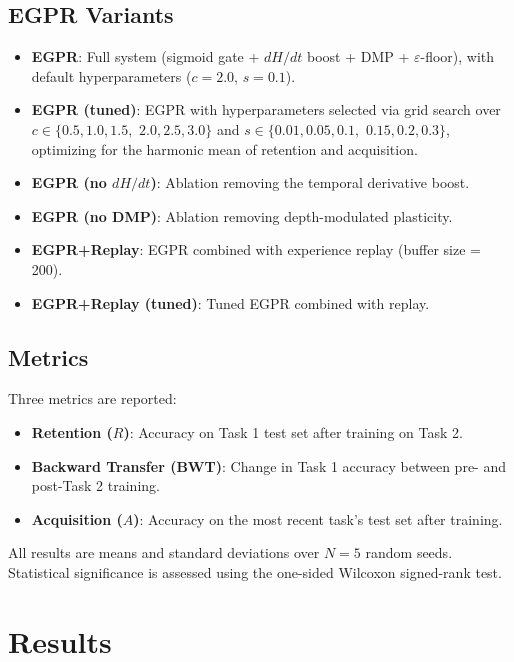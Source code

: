 \documentclass[11pt,a4paper]{article}
\begin{document}
\subsection{EGPR Variants}

\begin{itemize}
    \item \textbf{EGPR}: Full system (sigmoid gate + $dH/dt$ boost + DMP + $\varepsilon$-floor), with default hyperparameters ($c = 2.0$, $s = 0.1$).
    \item \textbf{EGPR (tuned)}: EGPR with hyperparameters selected via grid search over $c \in \{0.5, 1.0, 1.5,$ $2.0, 2.5, 3.0\}$ and $s \in \{0.01, 0.05, 0.1,$ $0.15, 0.2, 0.3\}$, optimizing for the harmonic mean of retention and acquisition.
    \item \textbf{EGPR (no $dH/dt$)}: Ablation removing the temporal derivative boost.
    \item \textbf{EGPR (no DMP)}: Ablation removing depth-modulated plasticity.
    \item \textbf{EGPR+Replay}: EGPR combined with experience replay (buffer size = 200).
    \item \textbf{EGPR+Replay (tuned)}: Tuned EGPR combined with replay.
\end{itemize}

\subsection{Metrics}

Three metrics are reported:

\begin{itemize}
    \item \textbf{Retention ($R$)}: Accuracy on Task 1 test set after training on Task 2.
    \item \textbf{Backward Transfer (BWT)}: Change in Task 1 accuracy between pre- and post-Task 2 training.
    \item \textbf{Acquisition ($A$)}: Accuracy on the most recent task's test set after training.
\end{itemize}

All results are means and standard deviations over $N = 5$ random seeds. Statistical significance is assessed using the one-sided Wilcoxon signed-rank test.

\section{Results}
\end{document}
